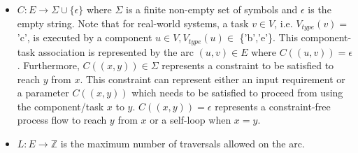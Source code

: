 \begin{defn}
\begin{itemize}
            \begin{itemize}
                \item \begin{math}C : E \rightarrow \Sigma \cup \{\epsilon\} \end{math} where $\Sigma$ is a finite non-empty set of symbols and $\epsilon$ is the empty string. Note that for real-world systems, a task \begin{math}v \in V\end{math}, i.e. \begin{math}V_{type}(v) = \end{math}'c', is executed by a component \begin{math}u \in V, V_{type}(u) \in \end{math} \{'b','e'\}. This component-task association is represented by the arc \begin{math}(u, v) \in E \end{math} where \begin{math}C((u,v)) = \epsilon\end{math}. Furthermore, \begin{math}C((x,y)) \in \Sigma\end{math} represents a constraint to be satisfied to reach \begin{math}y\end{math} from \begin{math}x\end{math}. This constraint can represent either an input requirement or a parameter \begin{math}C((x,y))\end{math} which needs to be satisfied to proceed from using the component/task \begin{math}x\end{math} to \begin{math}y\end{math}. \begin{math}C((x,y)) = \epsilon\end{math} represents a constraint-free process flow to reach \begin{math}y\end{math} from \begin{math}x\end{math} or a self-loop when \begin{math}x = y\end{math}.
                
                \item \begin{math}L : E \rightarrow \mathbb{Z}\end{math} is the maximum number of traversals allowed on the arc.
            \end{itemize}
        

\end{itemize}
\end{defn}
